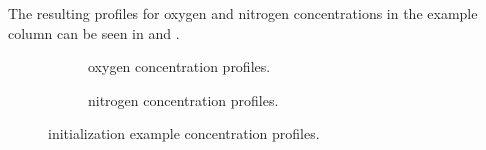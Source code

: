 
        The resulting profiles for oxygen and nitrogen concentrations in the example column can be seen
        in  and .

        \begin{figure}
            \scriptsize
            \hspace{0.01\textwidth}
            \begin{subfigure}{0.45\textwidth}
                
                \caption{oxygen concentration profiles.}
                \label{fig:lpc_example_o2}
            \end{subfigure}
            \hfill
            \begin{subfigure}{0.45\textwidth}
                
                \caption{nitrogen concentration profiles.}
                \label{fig:lpc_example_n2}
            \end{subfigure}
            \hspace{0.01\textwidth}
            \caption{initialization example concentration profiles.}
        \end{figure}

